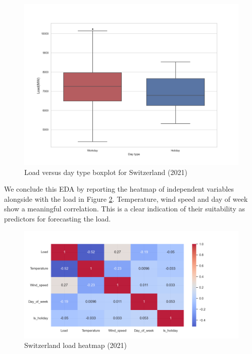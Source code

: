 \begin{figure}[!h]
    \includegraphics[width=\textwidth]{images/CH_is_holiday_boxplot_2021.png}
    \caption{Load versus day type boxplot for Switzerland (2021)}
    \label{fig:CH_is_holiday_boxplot_2021}
\end{figure}

We conclude this EDA by reporting the heatmap of independent variables alongside with the load in Figure \ref{fig:CH_heatmap_2021}. Temperature, wind speed and day of week show a meaningful correlation. This is a clear indication of their suitability as predictors for forecasting the load.

\begin{figure}[!h]
    \includegraphics[width=\textwidth]{images/CH_heatmap_2021.png}
    \caption{Switzerland load heatmap (2021)}
    \label{fig:CH_heatmap_2021}
\end{figure}